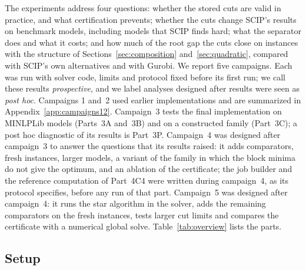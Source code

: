 The experiments address four questions: whether the stored cuts are valid in
practice, and what certification prevents; whether the cuts change SCIP's
results on benchmark models, including models that SCIP finds hard; what the
separator does and what it costs; and how much of the root gap the cuts close
on instances with the structure of Sections~\ref{sec:composition}
and~\ref{sec:quadratic}, compared with SCIP's own alternatives and with Gurobi.
We report five campaigns. Each was run with solver code, limits and protocol
fixed before its first run; we call these results \emph{prospective}, and we
label analyses designed after results were seen as \emph{post hoc}.
Campaigns 1 and~2 used earlier implementations and are summarized in
Appendix~\ref{app:campaigns12}. Campaign~3 tests the final implementation on
MINLPLib models (Parts~3A and~3B) and on a constructed family (Part~3C); a
post hoc diagnostic of its results is Part~3P. Campaign~4 was designed after
campaign~3 to answer the questions that its results raised: it adds
comparators, fresh instances, larger models, a variant of the family in which
the block minima do not give the optimum, and an ablation of the certificate;
the job builder and the reference computation of Part~4C4 were written during
campaign~4, as its protocol specifies, before any run of that part.
Campaign~5 was designed after campaign~4: it runs the star algorithm in the
solver, adds the remaining comparators on the fresh instances, tests larger cut
limits and compares the certificate with a numerical global solve.
Table~\ref{tab:overview} lists the parts.

\subsection{Setup}\label{sec:setup}


